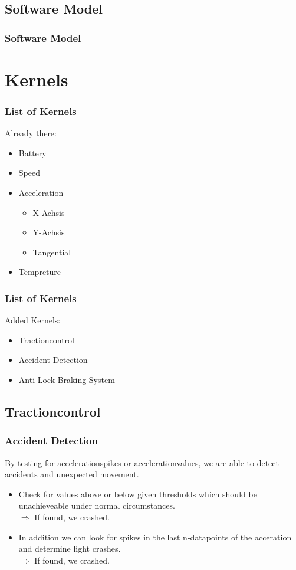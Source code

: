 \documentclass{beamer}
\begin{document}
\subsection{Software Model}
\begin{frame}
    \frametitle{Software Model}
\end{frame}

\section{Kernels}
\begin{frame} %
  \frametitle{List of Kernels} %
  Already there:
  \begin{itemize}
   \item Battery
   \item Speed
   \item Acceleration
   \begin{itemize}
    \item X-Achsis
    \item Y-Achsis
    \item Tangential
   \end{itemize}
   \item Tempreture
  \end{itemize}

\end{frame}
\begin{frame}
    \frametitle{List of Kernels}
    Added Kernels:
    \begin{itemize}
     \item Tractioncontrol
     \item Accident Detection
     \item Anti-Lock Braking System
    \end{itemize}
\end{frame}
\subsection{Tractioncontrol}
\begin{frame}
    \frametitle{Accident Detection}
    By testing for accelerationspikes or accelerationvalues, we are able to detect accidents and unexpected movement.\\
    \begin{itemize}
     \item Check for values above or below given thresholds which should be unachieveable under normal circumstances.\\
     $\Rightarrow$ If found, we crashed.
     \pause
     \item In addition we can look for spikes in the last n-datapoints of the acceration and determine light crashes.\\
     $\Rightarrow$ If found, we crashed.
     \pause
    \end{itemize}
\end{frame}
\end{document}
